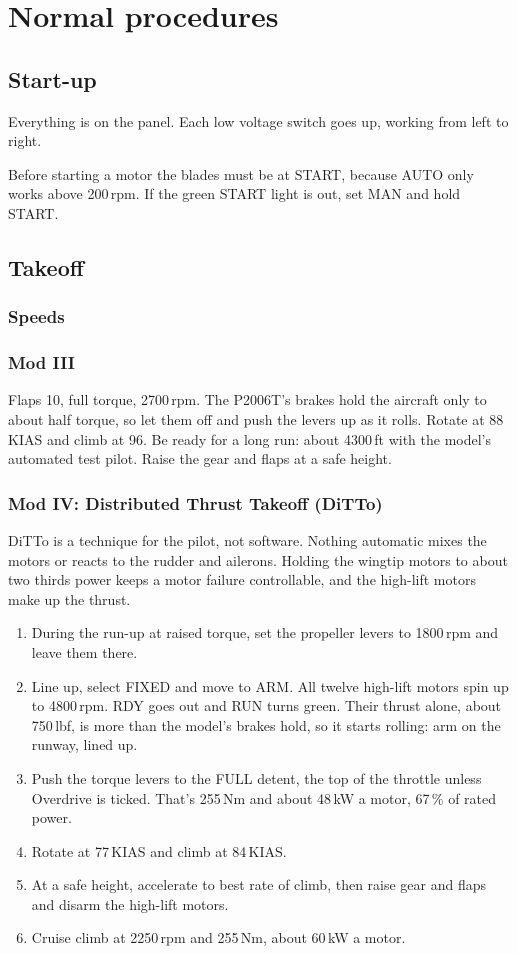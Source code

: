 \documentclass[11pt,a4paper,oneside]{book}
\newcommand{\Tab}[1]{\begingroup\small\endgroup\par\medskip}
\newcommand{\ann}[1]{\textsf{\small #1}}
\begin{document}
\chapter{Normal procedures}
\section{Start-up}
Everything is on the panel. Each low voltage switch goes up, working from left to right.

\Tab{startup}
\begin{caution}
Before starting a motor the blades must be at \ann{START}, because \ann{AUTO} only works above 200\,rpm. If the green \ann{START} light is out, set \ann{MAN} and hold \ann{START}.
\end{caution}

\section{Takeoff}
\subsection{Speeds}
\Tab{speeds}
\subsection{Mod III}
Flaps 10, full torque, 2700\,rpm. The P2006T's brakes hold the aircraft only to about half torque, so let them off and push the levers up as it rolls. Rotate at 88\,KIAS and climb at 96. Be ready for a long run: about 4300\,ft with the model's automated test pilot. Raise the gear and flaps at a safe height.

\subsection{Mod IV: Distributed Thrust Takeoff (DiTTo)}
DiTTo is a technique for the pilot, not software. Nothing automatic mixes the motors or reacts to the rudder and ailerons. Holding the wingtip motors to about two thirds power keeps a motor failure controllable, and the high-lift motors make up the thrust.
\begin{enumerate}
\item During the run-up at raised torque, set the propeller levers to 1800\,rpm and leave them there.
\item Line up, select \ann{FIXED} and move to \ann{ARM}. All twelve high-lift motors spin up to 4800\,rpm. \ann{RDY} goes out and \ann{RUN} turns green. Their thrust alone, about 750\,lbf, is more than the model's brakes hold, so it starts rolling: arm on the runway, lined up.
\item Push the torque levers to the \ann{FULL} detent, the top of the throttle unless Overdrive is ticked. That's 255\,Nm and about 48\,kW a motor, 67\,\% of rated power.
\item Rotate at 77\,KIAS and climb at 84\,KIAS.
\item At a safe height, accelerate to best rate of climb, then raise gear and flaps and disarm the high-lift motors.
\item Cruise climb at 2250\,rpm and 255\,Nm, about 60\,kW a motor.
\end{enumerate}
\end{document}
